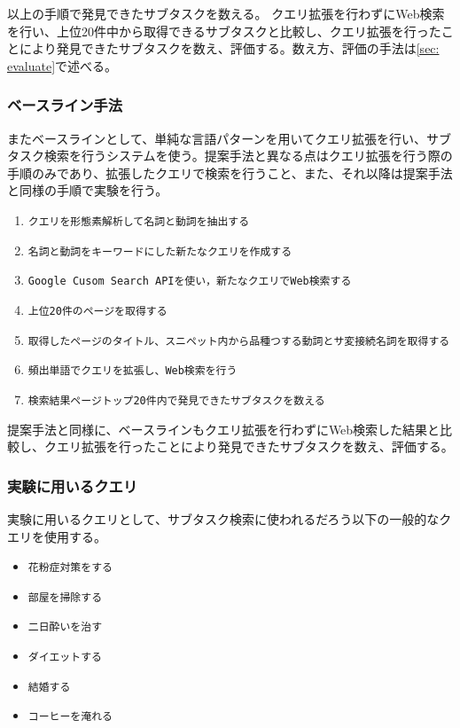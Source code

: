 \documentclass[submit,techreq]{ipsj}
\def\|{\verb|}
\begin{document}
以上の手順で発見できたサブタスクを数える。
クエリ拡張を行わずにWeb検索を行い、上位20件中から取得できるサブタスクと比較し、クエリ拡張を行ったことにより発見できたサブタスクを数え、評価する。数え方、評価の手法は\ref{sec: evaluate}で述べる。


%4.1.2
\subsubsection{ベースライン手法}

またベースラインとして、単純な言語パターンを用いてクエリ拡張を行い、サブタスク検索を行うシステムを使う。提案手法と異なる点はクエリ拡張を行う際の手順のみであり、拡張したクエリで検索を行うこと、また、それ以降は提案手法と同様の手順で実験を行う。


\begin{enumerate}
\item \|クエリを形態素解析して名詞と動詞を抽出する|
\item \|名詞と動詞をキーワードにした新たなクエリを作成する|
\item \|Google Cusom Search APIを使い，新たなクエリでWeb検索する|
\item \|上位20件のページを取得する|
\item \|取得したページのタイトル、スニペット内から品種つする動詞とサ変接続名詞を取得する|
\item \|頻出単語でクエリを拡張し、Web検索を行う|
\item \|検索結果ページトップ20件内で発見できたサブタスクを数える|
\end{enumerate}

提案手法と同様に、ベースラインもクエリ拡張を行わずにWeb検索した結果と比較し、クエリ拡張を行ったことにより発見できたサブタスクを数え、評価する。


\subsubsection{実験に用いるクエリ}

実験に用いるクエリとして、サブタスク検索に使われるだろう以下の一般的なクエリを使用する。

\begin{itemize}
\item \|花粉症対策をする|
\item \|部屋を掃除する|
\item \|二日酔いを治す|
\item \|ダイエットする|
\item \|結婚する|
\item \|コーヒーを淹れる|
\end{itemize}
\end{document}
